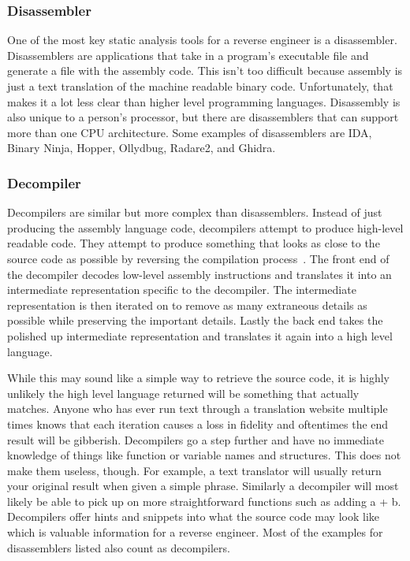 \subsubsection{Disassembler}
One of the most key static analysis tools for a reverse engineer is a disassembler. 
Disassemblers are applications that take in a program’s executable file and generate a file with the assembly code.
This isn’t too difficult because assembly is just a text translation of the machine readable binary code. 
Unfortunately, that makes it a lot less clear than higher level programming languages.  
Disassembly is also unique to a person’s processor, but there are disassemblers that can support more than one CPU architecture.
Some examples of disassemblers are IDA, Binary Ninja, Hopper, Ollydbug, Radare2, and Ghidra.

\subsubsection{Decompiler}
Decompilers are similar but more complex than disassemblers.
Instead of just producing the assembly language code, decompilers attempt to produce high-level readable code. 
They attempt to produce something that looks as close to the source code as possible by reversing the compilation process~\cite{Reversing}.
The front end of the decompiler decodes low-level assembly instructions and translates it into an intermediate representation specific to the decompiler. 
The intermediate representation is then iterated on to remove as many extraneous details as possible while preserving the important details. 
Lastly the back end takes the polished up intermediate representation and translates it again into a high level language.

While this may sound like a simple way to retrieve the source code, it is highly unlikely the high level language returned will be something that actually matches. 
Anyone who has ever run text through a translation website multiple times knows that each iteration causes a loss in fidelity and oftentimes the end result will be gibberish. 
Decompilers go a step further and have no immediate knowledge of things like function or variable names and structures. 
This does not make them useless, though. For example, a text translator will usually return your original result when given a simple phrase. 
Similarly a decompiler will most likely be able to pick up on more straightforward functions such as adding a + b. 
Decompilers offer hints and snippets into what the source code may look like which is valuable information for a reverse engineer. 
Most of the examples for disassemblers listed also count as decompilers.

